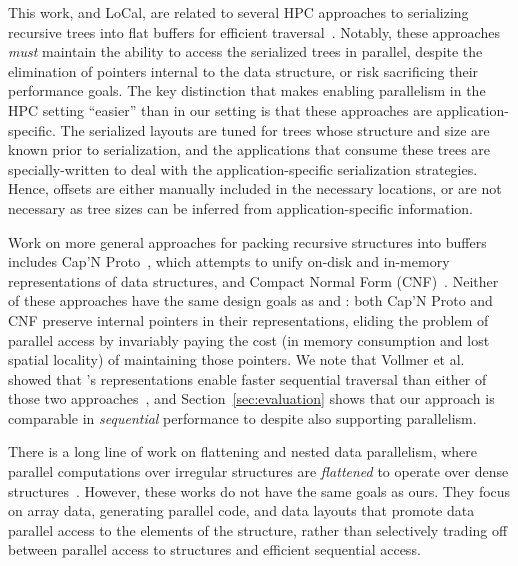 \documentclass[acmsmall,acmthm=false,nonacm]{acmart}
\theoremstyle{straighttext0}
\theoremstyle{straighttext}
\begin{document}
{This work, and LoCal, are related to several HPC approaches to serializing recursive trees into flat buffers for efficient traversal~\cite{goldfarb13sc, meyerovich11hotpar, makino90}. Notably, these approaches {\em must} maintain the ability to access the serialized trees in parallel, despite the elimination of pointers internal to the data structure, or risk sacrificing their performance goals. The key distinction that makes enabling parallelism in the HPC setting ``easier'' than in our setting is that these approaches are application-specific. The serialized layouts are tuned for trees whose structure and size are known prior to serialization, and the applications that consume these trees are specially-written to deal with the application-specific serialization strategies. Hence, offsets are either manually included in the necessary locations, or are not necessary as tree sizes can be inferred from application-specific information.

Work on more general approaches for packing recursive structures into buffers includes Cap'N Proto~\cite{capnproto}, which attempts to unify on-disk and in-memory representations of data structures, and Compact Normal Form (CNF)~\cite{cnf-icfp15}. Neither of these approaches have the same design goals as \seqcalc{} and \rparcalc{}:
%
both Cap'N Proto and CNF preserve internal pointers in their representations, eliding the problem of parallel access by invariably paying the cost (in memory consumption and lost spatial locality) of maintaining those pointers. We note that Vollmer et al. showed that \seqcalc{}'s representations enable faster sequential traversal than either of those two approaches~\cite{LoCal}, and Section~\ref{sec:evaluation} shows that our approach is comparable in {\em sequential} performance to \seqcalc{} despite also supporting parallelism.

There is a long line of work on flattening and nested data parallelism, where parallel computations over irregular structures are \textit{flattened} to operate over dense structures~\cite{nesl,keller98europar,bergstrom13ppopp}. However, these works do not have the same goals as ours. They focus on array
data, generating parallel code, and data layouts that promote data parallel access to the elements of the structure, rather than selectively trading off between parallel access to structures and efficient sequential access.

}
\end{document}
